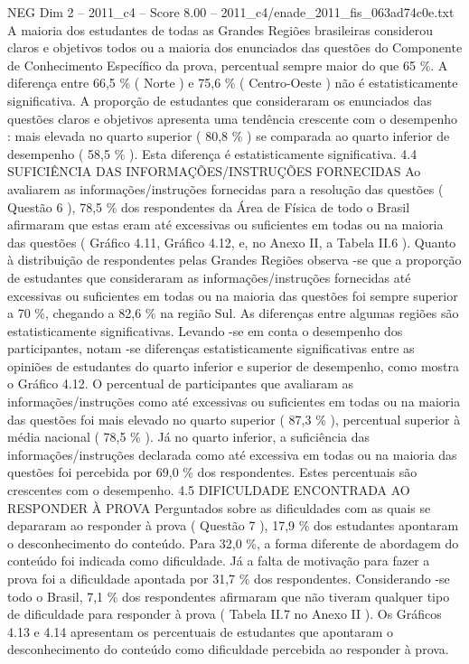 \begin{textsample}{NEG Dim 2 – 2011\_c4 – Score 8.00 – 2011\_c4/enade\_2011\_fis\_063ad74c0e.txt}
A maioria dos estudantes de todas as Grandes Regiões brasileiras considerou claros e objetivos todos ou a maioria dos enunciados das questões do Componente de Conhecimento Específico da prova, percentual sempre maior do que 65 \%.
A diferença entre 66,5 \% ( Norte ) e 75,6 \% ( Centro-Oeste ) não é estatisticamente significativa.
A proporção de estudantes que consideraram os enunciados das questões claros e objetivos apresenta uma tendência crescente com o desempenho : mais elevada no quarto superior ( 80,8 \% ) se comparada ao quarto inferior de desempenho ( 58,5 \% ).
Esta diferença é estatisticamente significativa. 4.4 SUFICIÊNCIA DAS INFORMAÇÕES/INSTRUÇÕES FORNECIDAS Ao avaliarem as informações/instruções fornecidas para a resolução das questões ( Questão 6 ), 78,5 \% dos respondentes da Área de Física de todo o Brasil afirmaram que estas eram até excessivas ou suficientes em todas ou na maioria das questões ( Gráfico 4.11, Gráfico 4.12, e, no Anexo II, a Tabela II.6 ).
Quanto à distribuição de respondentes pelas Grandes Regiões observa -se que a proporção de estudantes que consideraram as informações/instruções fornecidas até excessivas ou suficientes em todas ou na maioria das questões foi sempre superior a 70 \%, chegando a 82,6 \% na região Sul.
As diferenças entre algumas regiões são estatisticamente significativas.
Levando -se em conta o desempenho dos participantes, notam -se diferenças estatisticamente significativas entre as opiniões de estudantes do quarto inferior e superior de desempenho, como mostra o Gráfico 4.12.
O percentual de participantes que avaliaram as informações/instruções como até excessivas ou suficientes em todas ou na maioria das questões foi mais elevado no quarto superior ( 87,3 \% ), percentual superior à média nacional ( 78,5 \% ).
Já no quarto inferior, a suficiência das informações/instruções declarada como até excessiva em todas ou na maioria das questões foi percebida por 69,0 \% dos respondentes.
Estes percentuais são crescentes com o desempenho. 4.5 DIFICULDADE ENCONTRADA AO RESPONDER À PROVA Perguntados sobre as dificuldades com as quais se depararam ao responder à prova ( Questão 7 ), 17,9 \% dos estudantes apontaram o desconhecimento do conteúdo.
Para 32,0 \%, a forma diferente de abordagem do conteúdo foi indicada como dificuldade.
Já a falta de motivação para fazer a prova foi a dificuldade apontada por 31,7 \% dos respondentes.
Considerando -se todo o Brasil, 7,1 \% dos respondentes afirmaram que não tiveram qualquer tipo de dificuldade para responder à prova ( Tabela II.7 no Anexo II ).
Os Gráficos 4.13 e 4.14 apresentam os percentuais de estudantes que apontaram o desconhecimento do conteúdo como dificuldade percebida ao responder à prova.

\end{textsample}
